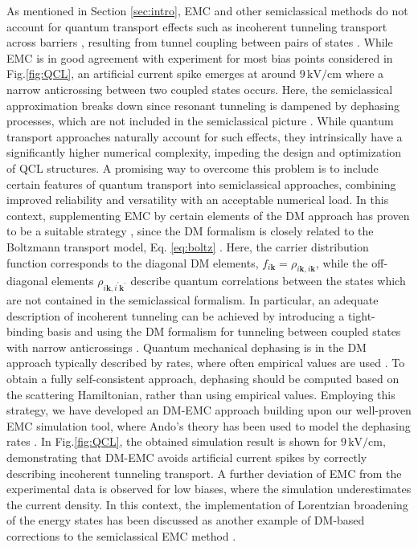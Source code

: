 \documentclass[a4paper]{spie}%
\begin{document}
As mentioned in Section \ref{sec:intro}, EMC and other semiclassical methods
do not account for quantum transport effects such as incoherent tunneling
transport across barriers \cite{2005JAP....98j4505C}, resulting from tunnel
coupling between pairs of states \cite{2009PhRvB..79p5322W}. While EMC is in
good agreement with experiment for most bias points considered in
Fig.\thinspace\ref{fig:QCL}, an artificial current spike emerges at around
$9\,\mathrm{kV}/\mathrm{cm}$ where a narrow anticrossing between two coupled
states occurs. Here, the semiclassical approximation breaks down since
resonant tunneling is dampened by dephasing processes, which are not included
in the semiclassical picture \cite{2005JAP....98j4505C}. While quantum
transport approaches naturally account for such effects, they intrinsically
have a significantly higher numerical complexity, impeding the design and
optimization of QCL structures. A promising way to overcome this problem is to
include certain features of quantum transport into semiclassical approaches,
combining improved reliability and versatility with an acceptable numerical
load. In this context, supplementing EMC by certain elements of the DM
approach has proven to be a suitable strategy
\cite{2005JAP....98j4505C,2012ApPhL.100a1108B,freeman2016self}, since the DM
formalism is closely related to the Boltzmann transport model, Eq.\thinspace
\ref{eq:boltz} \cite{2001PhRvL..87n6603I}. Here, the carrier distribution
function corresponds to the diagonal DM elements, $f_{i\mathbf{k}}%
=\rho_{i\mathbf{k},i\mathbf{k}}$, while the off-diagonal elements
$\rho_{i\mathbf{k},i^{\prime}\mathbf{k}^{\prime}}$ describe quantum
correlations between the states which are not contained in the semiclassical
formalism. In particular, an adequate description of incoherent tunneling can
be achieved by introducing a tight-binding basis and using the DM formalism
for tunneling between coupled states with narrow anticrossings
\cite{2005JAP....98j4505C,2012ApPhL.100a1108B,freeman2016self}. Quantum
mechanical dephasing is in the DM approach typically described by rates, where
often empirical values are used \cite{2005JAP....98j4505C}. To obtain a fully
self-consistent approach, dephasing should be computed based on the scattering
Hamiltonian, rather than using empirical values. Employing this strategy, we
have developed an DM-EMC approach building upon our well-proven EMC simulation
tool, where Ando's theory has been used to model the dephasing rates
\cite{ando1985line,freeman2016self}. In Fig.\thinspace\ref{fig:QCL}, the
obtained simulation result is shown for $9\,\mathrm{kV}/\mathrm{cm}$,
demonstrating that DM-EMC avoids artificial current spikes by correctly
describing incoherent tunneling transport. A further deviation of EMC from the
experimental data is observed for low biases, where the simulation
underestimates the current density. In this context, the implementation of
Lorentzian broadening of the energy states has been discussed as another
example of DM-based corrections to the semiclassical EMC method
\cite{2013ApPhL.102a1101M}.
\end{document}
